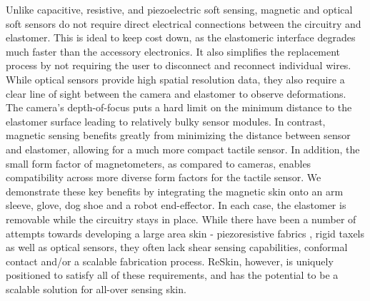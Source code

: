 \documentclass{article}
\begin{document}
Unlike capacitive\cite{sonar2018any}, resistive\cite{sundaram2019learning}, and piezoelectric\cite{bhattacharjee2013tactile} soft sensing, magnetic and optical soft sensors do not require direct electrical connections between the circuitry and elastomer. This is ideal to keep cost down, as the elastomeric interface degrades much faster than the accessory electronics. It also simplifies the replacement process by not requiring the user to disconnect and reconnect individual wires. While optical sensors provide high spatial resolution data, they also require a clear line of sight between the camera and elastomer to observe deformations\cite{donlon2018gelslim,wang2021gelsight}. The camera's depth-of-focus puts a hard limit on the minimum distance to the elastomer surface leading to relatively bulky sensor modules. In contrast, magnetic sensing benefits greatly from minimizing the distance between sensor and elastomer, allowing for a much more compact tactile sensor. In addition, the small form factor of magnetometers, as compared to cameras, enables compatibility across more diverse form factors for the tactile sensor. We demonstrate these key benefits by integrating the magnetic skin onto an arm sleeve, glove, dog shoe and a robot end-effector. In each case, the elastomer is removable while the circuitry stays in place. While there have been a number of attempts towards developing a large area skin - piezoresistive fabrics \cite{buscher2015flexible,bhattacharjee2013tactile,WADE20171}, rigid taxels \cite{cheng2019comprehensive} as well as optical sensors\cite{9247533}, they often lack shear sensing capabilities\cite{cheng2019comprehensive,bhattacharjee2013tactile,WADE20171}, conformal contact\cite{cheng2019comprehensive} and/or a scalable fabrication process\cite{bhattacharjee2013tactile}. ReSkin, however, is uniquely positioned to satisfy all of these requirements, and has the potential to be a scalable solution for all-over sensing skin.
\end{document}
